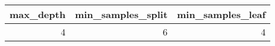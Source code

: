 \begin{tabular}{rrr}
\toprule
max_depth & min_samples_split & min_samples_leaf \\
\midrule
4 & 6 & 4 \\
\bottomrule
\end{tabular}
